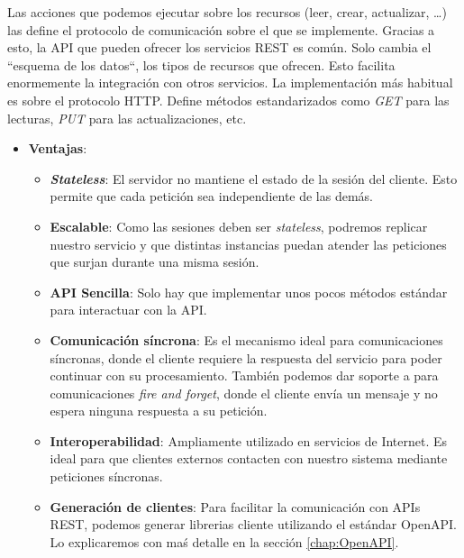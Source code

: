 Las acciones que podemos ejecutar sobre los recursos (leer, crear, actualizar, \dots) las define el protocolo de comunicación sobre el que se implemente. Gracias a esto, la API que pueden ofrecer los servicios REST es común. Solo cambia el ``esquema de los datos``, los tipos de recursos que ofrecen. Esto facilita enormemente la integración con otros servicios. \cite{nallyRESTVsRPC2018} La implementación más habitual es sobre el protocolo HTTP. Define métodos estandarizados como \emph{GET} para las lecturas, \emph{PUT} para las actualizaciones, etc.

\begin{itemize}
  \item \textbf{Ventajas}:

  \begin{itemize}
    \item \textbf{\emph{Stateless}}: El servidor no mantiene el estado de la sesión del cliente. Esto permite que cada petición sea independiente de las demás.

    \item \textbf{Escalable}: Como las sesiones deben ser \emph{stateless}, podremos replicar nuestro servicio y que distintas instancias puedan atender las peticiones que surjan durante una misma sesión.

    \item \textbf{API Sencilla}: Solo hay que implementar unos pocos métodos estándar para interactuar con la API.

    \item \textbf{Comunicación síncrona}: Es el mecanismo ideal para comunicaciones síncronas, donde el cliente requiere la respuesta del servicio para poder continuar con su procesamiento. También podemos dar soporte a para comunicaciones \emph{fire and forget}, donde el cliente envía un mensaje y no espera ninguna respuesta a su petición.

    \item \textbf{Interoperabilidad}: Ampliamente utilizado en servicios de Internet. Es ideal para que clientes externos contacten con nuestro sistema mediante peticiones síncronas. \cite{newmanBuildingMicroservicesDesigning2021}

    \item \textbf{Generación de clientes}: Para facilitar la comunicación con APIs REST, podemos generar librerias cliente utilizando el estándar OpenAPI. Lo explicaremos con maś detalle en la sección \ref{chap:OpenAPI}.
  \end{itemize}


\end{itemize}
